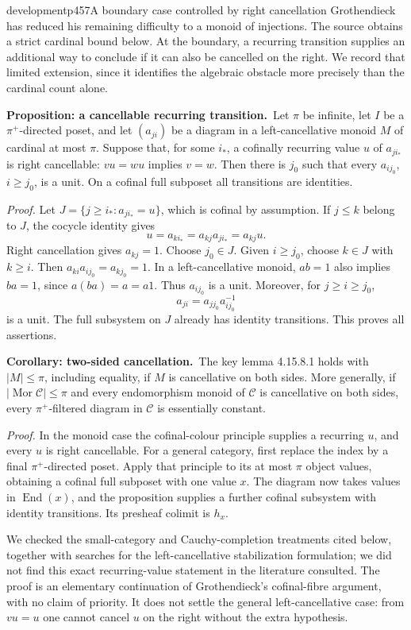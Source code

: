 \begin{dcomment}{development}{p457}{A boundary case controlled by right cancellation}
Grothendieck has reduced his remaining difficulty to a monoid of injections. The source obtains a strict cardinal bound below. At the boundary, a recurring transition supplies an additional way to conclude if it can also be cancelled on the right. We record that limited extension, since it identifies the algebraic obstacle more precisely than the cardinal count alone.

\textbf{Proposition: a cancellable recurring transition.}\ours\
Let $\pi$ be infinite, let $I$ be a $\pi^+$-directed poset, and let $(a_{ji})$ be a diagram in a left-cancellative monoid $M$ of cardinal at most $\pi$. Suppose that, for some $i_*$, a cofinally recurring value $u$ of $a_{ji_*}$ is right cancellable: $vu=wu$ implies $v=w$. Then there is $j_0$ such that every $a_{ij_0}$, $i\ge j_0$, is a unit. On a cofinal full subposet all transitions are identities.

\emph{Proof.} Let $J=\{j\ge i_*:a_{ji_*}=u\}$, which is cofinal by assumption. If $j\le k$ belong to $J$, the cocycle identity gives
\[
u=a_{ki_*}=a_{kj}a_{ji_*}=a_{kj}u.
\]
Right cancellation gives $a_{kj}=1$. Choose $j_0\in J$. Given $i\ge j_0$, choose $k\in J$ with $k\ge i$. Then
$a_{ki}a_{ij_0}=a_{kj_0}=1$.
In a left-cancellative monoid, $ab=1$ also implies $ba=1$, since
$a(ba)=a=a1$. Thus $a_{ij_0}$ is a unit. Moreover, for $j\ge i\ge j_0$,
\[
a_{ji}=a_{jj_0}a_{ij_0}^{-1}
\]
is a unit. The full subsystem on $J$ already has identity transitions. This proves all assertions.

\textbf{Corollary: two-sided cancellation.}\ours\
The key lemma 4.15.8.1 holds with $|M|\le\pi$, including equality, if $M$ is cancellative on both sides. More generally, if $|\operatorname{Mor}\mathcal C|\le\pi$ and every endomorphism monoid of $\mathcal C$ is cancellative on both sides, every $\pi^+$-filtered diagram in $\mathcal C$ is essentially constant.

\emph{Proof.} In the monoid case the cofinal-colour principle supplies a recurring $u$, and every $u$ is right cancellable. For a general category, first replace the index by a final $\pi^+$-directed poset. Apply that principle to its at most $\pi$ object values, obtaining a cofinal full subposet with one value $x$. The diagram now takes values in $\operatorname{End}(x)$, and the proposition supplies a further cofinal subsystem with identity transitions. Its presheaf colimit is $h_x$.

We checked the small-category and Cauchy-completion treatments cited below, together with searches for the left-cancellative stabilization formulation; we did not find this exact recurring-value statement in the literature consulted. The proof is an elementary continuation of Grothendieck's cofinal-fibre argument, with no claim of priority. It does not settle the general left-cancellative case: from $vu=u$ one cannot cancel $u$ on the right without the extra hypothesis.
\end{dcomment}

